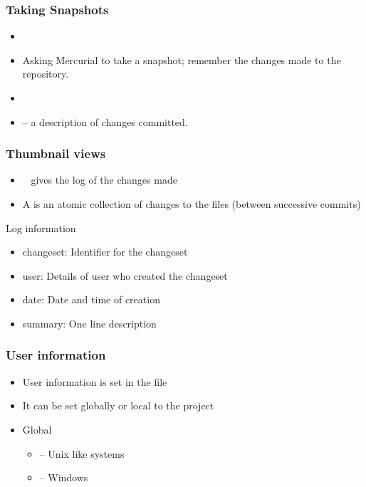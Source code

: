 \documentclass[14pt,compress]{beamer}
\begin{document}
\begin{frame}
  \frametitle{Taking Snapshots}
  \begin{itemize}
  \item {}
  \item Asking Mercurial to take a snapshot; remember the changes made
    to the repository. 
  \item {}
  \item {} -- a description of changes committed. 
  \end{itemize}
\end{frame}

\begin{frame}
  \frametitle{Thumbnail views}
  \begin{itemize}
  \item {}~ gives the log of the changes made
  \item A  is an atomic collection of changes to the
    files (between successive commits)
  \end{itemize}
  \begin{block}{Log information}
    \begin{itemize}
    \item \alert{changeset}: Identifier for the changeset
    \item \alert{user}: Details of user who created the changeset
    \item \alert{date}: Date and time of creation
    \item \alert{summary}: One line description
    \end{itemize}    
  \end{block}
\end{frame}

\begin{frame}
  \frametitle{User information}
  \begin{itemize}
  \item User information is set in the  file
  \item It can be set globally or local to the project
  \item Global 
    \begin{itemize}
    \item {} -- Unix like systems
    \item {} -- Windows
    \end{itemize}
  \end{itemize}
\end{frame}
\end{document}

